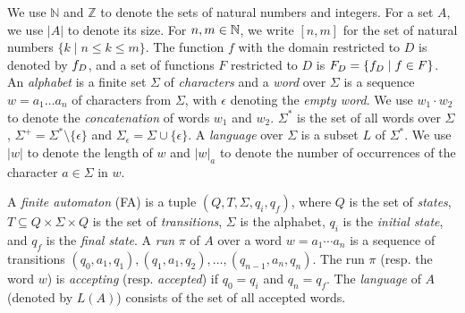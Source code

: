 \documentclass[sigplan,review,anonymous]{acmart}\settopmatter{printfolios=true,printccs=false,printacmref=false}
\begin{document}
We use $\mathbb{N}$ and $\mathbb{Z}$ to denote the sets of natural numbers and 
integers. For a set $A$, we use $|A|$ to denote its size. 
For $n,m\in\mathbb{N}$, we write $[n,m]$ for the set of natural numbers 
$\{k\mid n\leq k \leq m\}$. 
The function $f$ with the domain restricted to $D$ is denoted by $f_{D}$,
and a set of functions $F$ restricted to $D$ is $F_{D} = \{f_{D} \mid f \in F\}$.
An \emph{alphabet} is a finite set $\Sigma$ of \emph{characters} and a \emph{word} over $\Sigma$ is a sequence $w = a_1\ldots a_n$ of characters from $\Sigma$, with $\epsilon$ denoting the \emph{empty word}. 
We use $w_1\cdot w_2$ to denote the \emph{concatenation} of words $w_1$ and $w_2$.
$\Sigma^*$ is the set of all words over $\Sigma$, $\Sigma^+ = \Sigma^*\setminus \{\epsilon\}$ and $\Sigma_\epsilon = \Sigma\cup\{\epsilon\}$.
A \emph{language} over $\Sigma$ is a subset $L$ of $\Sigma^*$. 
%
We use $|w|$ to denote the length of $w$ and $|w|_a$ to denote the number of occurrences of the character $a\in \Sigma$ in $w$. 

A \emph{finite automaton} (FA) is a tuple $(Q,T,\Sigma,q_i,q_f)$, where $Q$ is the set of \emph{states}, $T\subseteq Q\times \Sigma \times Q $ is the set of \emph{transitions}, $\Sigma$ is the alphabet, $q_i$ is the \emph{initial state}, and $q_f$ is the \emph{final state}. 
A \emph{run} $\pi$ of $A$ over a word $w = a_1\cdots a_n$ is a sequence of transitions $(q_0,a_1,q_1),(q_1,a_1,q_2),\ldots,(q_{n-1},a_n,q_n)$. The run $\pi$ (resp. the word $w$) is \emph{accepting} (resp. \emph{accepted}) if $q_0 = q_i$ and $q_n = q_f$.
The \emph{language} of $A$ (denoted by $L(A)$) consists of  the set  of all accepted words.

%
\end{document}
